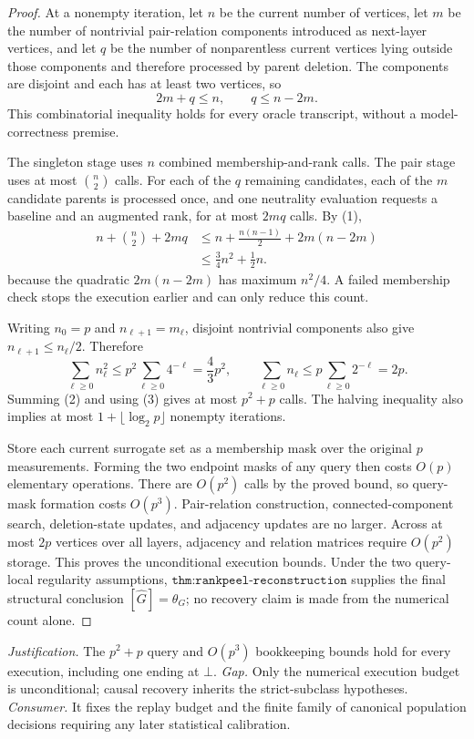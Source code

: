 \documentclass{article}
\begin{document}
\begin{proof}
At a nonempty iteration, let \(n\) be the current number of vertices, let \(m\) be the number of nontrivial pair-relation components introduced as next-layer vertices, and let \(q\) be the number of nonparentless current vertices lying outside those components and therefore processed by parent deletion.  The components are disjoint and each has at least two vertices, so
\[
 2m+q\leq n,
 \qquad q\leq n-2m. \tag{1}
\]
This combinatorial inequality holds for every oracle transcript, without a model-correctness premise.

The singleton stage uses \(n\) combined membership-and-rank calls.  The pair stage uses at most \(\binom n2\) calls.  For each of the \(q\) remaining candidates, each of the \(m\) candidate parents is processed once, and one neutrality evaluation requests a baseline and an augmented rank, for at most \(2mq\) calls.  By (1),
\[
 \begin{aligned}
 n+\binom n2+2mq
 &\leq n+\frac{n(n-1)}2+2m(n-2m)\\
 &\leq \frac34n^2+\frac12n.
 \end{aligned} \tag{2}
\]
because the quadratic \(2m(n-2m)\) has maximum \(n^2/4\).  A failed membership check stops the execution earlier and can only reduce this count.

Writing \(n_0=p\) and \(n_{\ell+1}=m_\ell\), disjoint nontrivial components also give \(n_{\ell+1}\leq n_\ell/2\).  Therefore
\[
 \sum_{\ell\geq0}n_\ell^2\leq p^2\sum_{\ell\geq0}4^{-\ell}=\frac43p^2,
 \qquad
 \sum_{\ell\geq0}n_\ell\leq p\sum_{\ell\geq0}2^{-\ell}=2p. \tag{3}
\]
Summing (2) and using (3) gives at most \(p^2+p\) calls.  The halving inequality also implies at most \(1+\lfloor\log_2p\rfloor\) nonempty iterations.

Store each current surrogate set as a membership mask over the original \(p\) measurements.  Forming the two endpoint masks of any query then costs \(O(p)\) elementary operations.  There are \(O(p^2)\) calls by the proved bound, so query-mask formation costs \(O(p^3)\).  Pair-relation construction, connected-component search, deletion-state updates, and adjacency updates are no larger.  Across at most \(2p\) vertices over all layers, adjacency and relation matrices require \(O(p^2)\) storage.  This proves the unconditional execution bounds.  Under the two query-local regularity assumptions, \(\texttt{thm:rankpeel-reconstruction}\) supplies the final structural conclusion \([\widehat G]=\theta_G\); no recovery claim is made from the numerical count alone.
\end{proof}
\par\smallskip\noindent \textit{Justification.} The \(p^2+p\) query and \(O(p^3)\) bookkeeping bounds hold for every execution, including one ending at \(\bot\). \textit{Gap.} Only the numerical execution budget is unconditional; causal recovery inherits the strict-subclass hypotheses. \textit{Consumer.} It fixes the replay budget and the finite family of canonical population decisions requiring any later statistical calibration.
\end{document}
